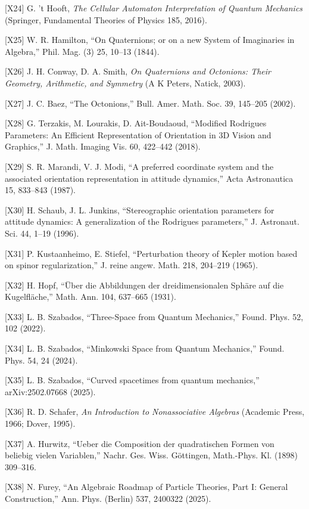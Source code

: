 \documentclass[
  a4paper,
]{ltjsarticle}
\begin{document}
{[}X24{]} G. 't Hooft, \emph{The Cellular Automaton Interpretation of
Quantum Mechanics} (Springer, Fundamental Theories of Physics 185,
2016).

{[}X25{]} W. R. Hamilton, ``On Quaternions; or on a new System of
Imaginaries in Algebra,'' Phil. Mag. (3) 25, 10--13 (1844).

{[}X26{]} J. H. Conway, D. A. Smith, \emph{On Quaternions and Octonions:
Their Geometry, Arithmetic, and Symmetry} (A K Peters, Natick, 2003).

{[}X27{]} J. C. Baez, ``The Octonions,'' Bull. Amer. Math. Soc. 39,
145--205 (2002).

{[}X28{]} G. Terzakis, M. Lourakis, D. Ait-Boudaoud, ``Modified
Rodrigues Parameters: An Efficient Representation of Orientation in 3D
Vision and Graphics,'' J. Math. Imaging Vis. 60, 422--442 (2018).

{[}X29{]} S. R. Marandi, V. J. Modi, ``A preferred coordinate system and
the associated orientation representation in attitude dynamics,'' Acta
Astronautica 15, 833--843 (1987).

{[}X30{]} H. Schaub, J. L. Junkins, ``Stereographic orientation
parameters for attitude dynamics: A generalization of the Rodrigues
parameters,'' J. Astronaut. Sci. 44, 1--19 (1996).

{[}X31{]} P. Kustaanheimo, E. Stiefel, ``Perturbation theory of Kepler
motion based on spinor regularization,'' J. reine angew. Math. 218,
204--219 (1965).

{[}X32{]} H. Hopf, ``Über die Abbildungen der dreidimensionalen Sphäre
auf die Kugelfläche,'' Math. Ann. 104, 637--665 (1931).

{[}X33{]} L. B. Szabados, ``Three-Space from Quantum Mechanics,'' Found.
Phys. 52, 102 (2022).

{[}X34{]} L. B. Szabados, ``Minkowski Space from Quantum Mechanics,''
Found. Phys. 54, 24 (2024).

{[}X35{]} L. B. Szabados, ``Curved spacetimes from quantum mechanics,''
arXiv:2502.07668 (2025).

{[}X36{]} R. D. Schafer, \emph{An Introduction to Nonassociative
Algebras} (Academic Press, 1966; Dover, 1995).

{[}X37{]} A. Hurwitz, ``Ueber die Composition der quadratischen Formen
von beliebig vielen Variablen,'' Nachr. Ges. Wiss. Göttingen,
Math.-Phys. Kl. (1898) 309--316.

{[}X38{]} N. Furey, ``An Algebraic Roadmap of Particle Theories, Part I:
General Construction,'' Ann. Phys. (Berlin) 537, 2400322 (2025).
\end{document}

